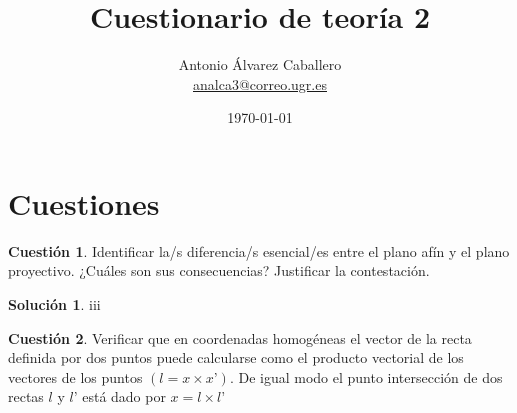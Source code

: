 \documentclass[a4paper, 11pt]{article}
\title{Cuestionario de teoría 2}
\author{Antonio Álvarez Caballero\\
    \href{mailto:analca3@correo.ugr.es}{analca3@correo.ugr.es}}
\date{\today}
\theoremstyle{definition}
\newtheorem{cuestion}{Cuestión}
\newtheorem*{solucion}{Solución}
\begin{document}
  \maketitle

  \section{Cuestiones}

  \begin{cuestion}
    Identificar la/s diferencia/s esencial/es entre el plano afín y el plano
    proyectivo. ¿Cuáles son sus consecuencias? Justificar la contestación.

  \end{cuestion}

  \begin{solucion}
    iii
  \end{solucion}

  \begin{cuestion}
    Verificar que en coordenadas homogéneas el vector de la recta definida por
    dos puntos puede calcularse como el producto vectorial de los vectores de los
    puntos $(l = x \times x’)$. De igual modo el punto intersección de dos rectas $l$ y
    $l’$ está dado por $x = l \times l’$

  \end{cuestion}
\end{document}
